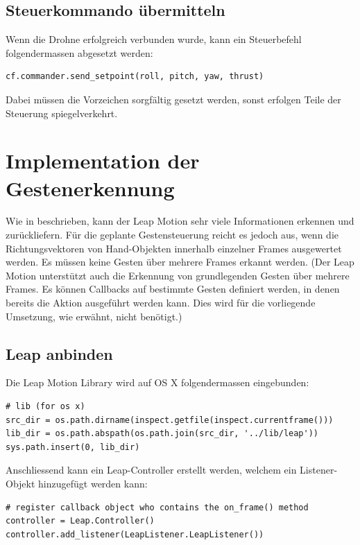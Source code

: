\subsection{Steuerkommando übermitteln}
Wenn die Drohne erfolgreich verbunden wurde, kann ein Steuerbefehl folgendermassen abgesetzt werden:

\begin{lstlisting}[style=lstStyleCpp]
cf.commander.send_setpoint(roll, pitch, yaw, thrust)
\end{lstlisting}

Dabei müssen die Vorzeichen sorgfältig gesetzt werden, sonst erfolgen Teile der Steuerung spiegelverkehrt.


\section{Implementation der Gestenerkennung}
Wie in  beschrieben, kann der Leap Motion sehr viele Informationen erkennen und zurückliefern.
Für die geplante Gestensteuerung reicht es jedoch aus, wenn die Richtungsvektoren von Hand-Objekten innerhalb einzelner Frames ausgewertet werden.
Es müssen keine Gesten über mehrere Frames erkannt werden. (Der Leap Motion unterstützt auch die Erkennung von grundlegenden Gesten über mehrere Frames. Es können Callbacks auf bestimmte Gesten definiert werden, in denen bereits die Aktion ausgeführt werden kann. Dies wird für die vorliegende Umsetzung, wie erwähnt, nicht benötigt.)

\subsection{Leap anbinden}
Die Leap Motion Library wird auf OS X folgendermassen eingebunden:
\begin{lstlisting}[style=lstStyleCpp]
# lib (for os x)
src_dir = os.path.dirname(inspect.getfile(inspect.currentframe()))
lib_dir = os.path.abspath(os.path.join(src_dir, '../lib/leap'))
sys.path.insert(0, lib_dir)
\end{lstlisting}

Anschliessend kann ein Leap-Controller erstellt werden, welchem ein Listener-Objekt hinzugefügt werden kann:
\begin{lstlisting}[style=lstStyleCpp]
# register callback object who contains the on_frame() method
controller = Leap.Controller()
controller.add_listener(LeapListener.LeapListener())
\end{lstlisting}

